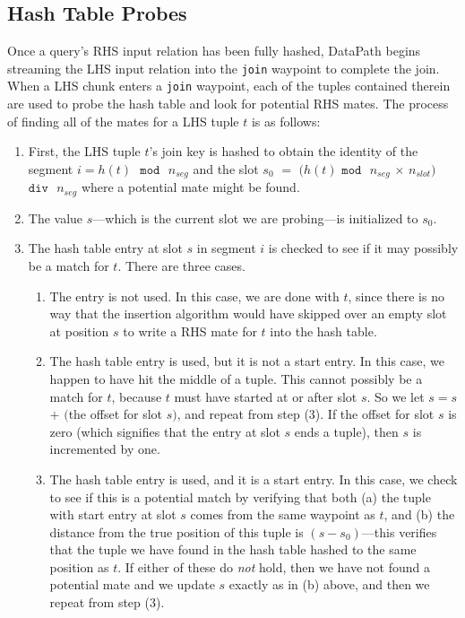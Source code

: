 \documentclass{sig-alternate}
\renewcommand\:{\colon} %
\begin{document}
\subsection{Hash Table Probes}

Once a query's RHS input relation has been fully hashed, DataPath begins streaming the LHS input relation into
the \texttt{join} waypoint to complete the join.
When a LHS chunk enters a \texttt{join} waypoint, each of the tuples contained therein are used
to probe the hash table and look for potential RHS mates.
The process of finding all of the mates for a LHS tuple $t$ is as follows:

\begin{enumerate}

\item First, the LHS tuple $t$'s join key is hashed to obtain the identity of the segment $i = h(t) \textrm{ }\texttt{mod}\textrm{ } n_{seg}$ and the slot 
$s_0$ $=$ $(h(t)$ $\texttt{mod}\textrm{ } n_{seg}$ $\times$ $n_{slot})$ $\texttt{div}\textrm{ } n_{seg}$
where a potential mate might be found.

\item The value $s$---which is the current slot we are probing---is initialized to $s_0$.

\item The hash table entry at slot $s$ in segment $i$ is checked to see if it may possibly be a match for $t$.  There are three cases.

\begin{enumerate} 

\item The entry is not used.  In this case, we are done with $t$, since there is no way that the insertion algorithm would have
skipped over an empty slot at position $s$ to write a RHS mate for $t$ into the hash table.

\item The hash table entry is used, but it is not a start entry.  In this case, we happen
to have hit the middle of a tuple.  This cannot possibly be a match for $t$, because $t$ must have started at or after slot $s$.
So we let $s = s$ $+$ $($the offset for slot $s)$, and repeat from step (3).
If the offset for slot $s$ is zero (which signifies that the entry at slot $s$ ends a tuple), then $s$ is incremented by one.

\item The hash table entry is used, and it is a start entry.  In this case, we check to see if this is a potential match 
by verifying that both (a) the tuple with start entry at slot $s$ comes from the same waypoint as $t$, and (b) 
the distance from the true position of this tuple is $(s - s_0)$---this verifies that the tuple we have found in the hash
table hashed to the same position as $t$.  If either of these do \emph{not} hold, then we have 
not found a potential mate and we update $s$ exactly as in (b) above, and then we repeat from step (3).


\end{enumerate}
\end{enumerate}
\end{document}
